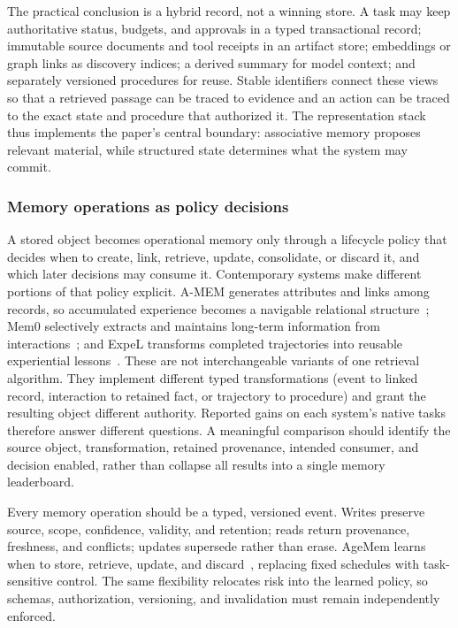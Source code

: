 The practical conclusion is a hybrid record, not a winning store. A task may keep authoritative status, budgets, and approvals in a typed transactional record; immutable source documents and tool receipts in an artifact store; embeddings or graph links as discovery indices; a derived summary for model context; and separately versioned procedures for reuse. Stable identifiers connect these views so that a retrieved passage can be traced to evidence and an action can be traced to the exact state and procedure that authorized it. The representation stack thus implements the paper's central boundary: associative memory proposes relevant material, while structured state determines what the system may commit.

\subsubsection{Memory operations as policy decisions}

A stored object becomes operational memory only through a lifecycle policy that decides when to create, link, retrieve, update, consolidate, or discard it, and which later decisions may consume it. Contemporary systems make different portions of that policy explicit. A-MEM generates attributes and links among records, so accumulated experience becomes a navigable relational structure~\cite{xu2025amem}; Mem0 selectively extracts and maintains long-term information from interactions~\cite{chhikara2025mem0}; and ExpeL transforms completed trajectories into reusable experiential lessons~\cite{zhao2024expel}. These are not interchangeable variants of one retrieval algorithm. They implement different typed transformations (event to linked record, interaction to retained fact, or trajectory to procedure) and grant the resulting object different authority. Reported gains on each system's native tasks therefore answer different questions. A meaningful comparison should identify the source object, transformation, retained provenance, intended consumer, and decision enabled, rather than collapse all results into a single memory leaderboard.

Every memory operation should be a typed, versioned event. Writes preserve source, scope, confidence, validity, and retention; reads return provenance, freshness, and conflicts; updates supersede rather than erase. AgeMem learns when to store, retrieve, update, and discard~\cite{yu2026agemem}, replacing fixed schedules with task-sensitive control. The same flexibility relocates risk into the learned policy, so schemas, authorization, versioning, and invalidation must remain independently enforced.

